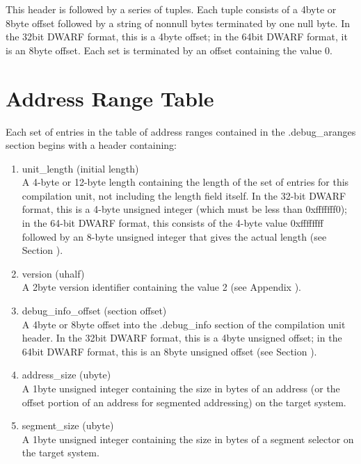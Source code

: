 This header is followed by a series of tuples. Each tuple
consists of a 4\dash byte or 8\dash byte offset followed by a string
of non\dash null bytes terminated by one null byte. 
In the 32\dash bit
DWARF format, this is a 4\dash byte offset; in the 64\dash bit DWARF
format, it is an 8\dash byte offset. 
Each set is terminated by an
offset containing the value 0.


\section{Address Range Table}
\label{datarep:addrssrangetable}

Each set of entries in the table of address ranges contained
in the .debug\_aranges section begins with a header containing:

\begin{enumerate}[1.]

\item unit\_length (initial length) \\
A 4-byte or 12-byte length containing the length of the
set of entries for this compilation unit, not including the
length field itself. In the 32-bit DWARF format, this is a
4-byte unsigned integer (which must be less than 0xfffffff0);
in the 64-bit DWARF format, this consists of the 4-byte value
0xffffffff followed by an 8-byte unsigned integer that gives
the actual length 
(see Section ).

\item version (uhalf) \\
A 2\dash byte version identifier containing the value 2 
(see Appendix ). 

\item debug\_info\_offset (section offset) \\
A 4\dash byte or 8\dash byte offset into the .debug\_info section of
the compilation unit header. In the 32\dash bit DWARF format,
this is a 4\dash byte unsigned offset; in the 64\dash bit DWARF format,
this is an 8\dash byte unsigned offset 
(see Section ).

\item address\_size (ubyte) \\
A 1\dash byte unsigned integer containing the size in bytes of an
address (or the offset portion of an address for segmented
addressing) on the target system.

\item segment\_size (ubyte) \\
A 1\dash byte unsigned integer containing the size in bytes of a
segment selector on the target system.

\end{enumerate}

